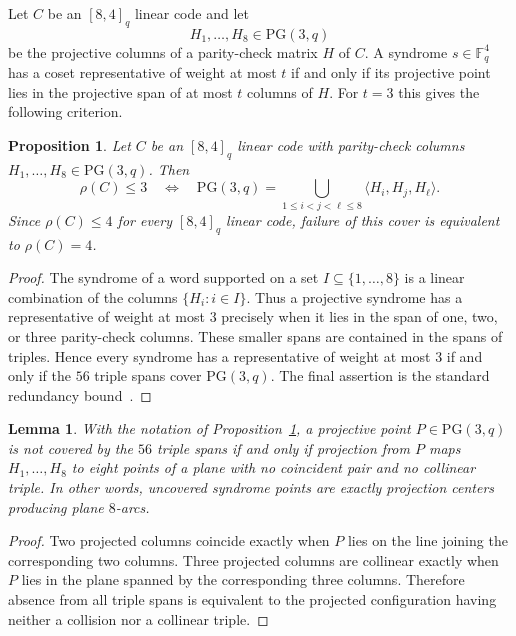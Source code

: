 ﻿\documentclass[11pt]{article}
\newcommand{\F}{\mathbb F}
\newcommand{\PG}{\mathrm{PG}}
\theoremstyle{plain}
\newtheorem{proposition}[theorem]{Proposition}
\newtheorem{lemma}[theorem]{Lemma}
\theoremstyle{definition}
\begin{document}
Let \(C\) be an \([8,4]_q\) linear code and let
\[
  H_1,\ldots,H_8\in \PG(3,q)
\]
be the projective columns of a parity-check matrix \(H\) of \(C\).  A
syndrome \(s\in\F_q^4\) has a coset representative of weight at most \(t\) if
and only if its projective point lies in the projective span of at most \(t\)
columns of \(H\).  For \(t=3\) this gives the following criterion.

\begin{proposition}\label{prop:criterion}
Let \(C\) be an \([8,4]_q\) linear code with parity-check columns
\(H_1,\ldots,H_8\in\PG(3,q)\).  Then
\[
  \rho(C)\le 3
  \quad\Longleftrightarrow\quad
  \PG(3,q)=
  \bigcup_{1\le i<j<\ell\le 8}
  \langle H_i,H_j,H_\ell\rangle.
\]
Since \(\rho(C)\le 4\) for every \([8,4]_q\) linear code, failure of this
cover is equivalent to \(\rho(C)=4\).
\end{proposition}

\begin{proof}
The syndrome of a word supported on a set \(I\subseteq\{1,\ldots,8\}\) is a
linear combination of the columns \(\{H_i:i\in I\}\).  Thus a projective
syndrome has a representative of weight at most \(3\) precisely when it lies
in the span of one, two, or three parity-check columns.  These smaller spans
are contained in the spans of triples.  Hence every syndrome has a
representative of weight at most \(3\) if and only if the \(56\) triple spans
cover \(\PG(3,q)\).  The final assertion is the standard redundancy
bound~\cite{Cohen1997,Huffman2003}.
\end{proof}

\begin{lemma}\label{lem:projection}
With the notation of Proposition~\ref{prop:criterion}, a projective point
\(P\in\PG(3,q)\) is not covered by the \(56\) triple spans if and only if
projection from \(P\) maps \(H_1,\ldots,H_8\) to eight points of a plane with
no coincident pair and no collinear triple.  In other words, uncovered
syndrome points are exactly projection centers producing plane \(8\)-arcs.
\end{lemma}

\begin{proof}
Two projected columns coincide exactly when \(P\) lies on the line joining the
corresponding two columns.  Three projected columns are collinear exactly when
\(P\) lies in the plane spanned by the corresponding three columns.  Therefore
absence from all triple spans is equivalent to the projected configuration
having neither a collision nor a collinear triple.
\end{proof}
\end{document}
